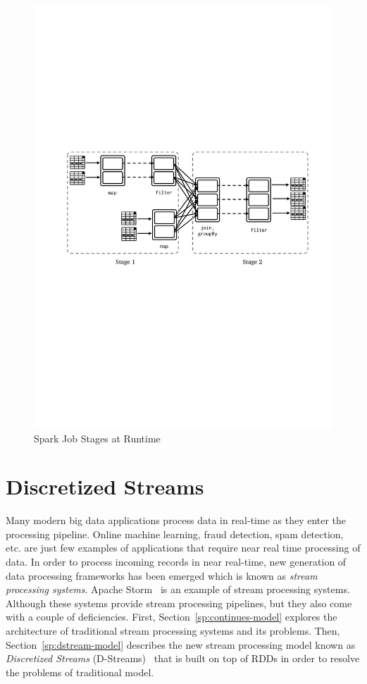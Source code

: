 \begin{figure}[h!]
    \includegraphics[clip,trim=2.3cm 11.4cm 1.7cm 10cm,scale=0.97]{stage-dag.pdf}
    \caption{Spark Job Stages at Runtime}
    \label{fig:sp:dag}
\end{figure}

\clearpage
\section{Discretized Streams}
\label{sp:dstream}

Many modern big data applications process data in real-time as they enter the processing pipeline. Online machine learning, fraud detection, spam detection, etc. are just few examples of applications that require near real time processing of data. In order to process incoming records in near real-time, new generation of data processing frameworks has been emerged which is known as \emph{stream processing systems}. Apache Storm~\cite{Storm} is an example of stream processing systems. Although these systems provide stream processing pipelines, but they also come with a couple of deficiencies. First, Section~\ref{sp:continues-model} explores the architecture of traditional stream processing systems and its problems. Then, Section~\ref{sp:dstream-model} describes the new stream processing model known as \emph{Discretized Streams} (D-Streams)~\cite{Zaharia:2013} that is built on top of RDDs in order to resolve the problems of traditional model.

